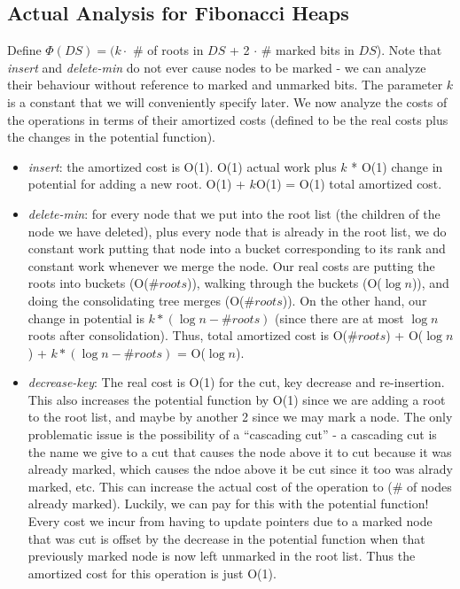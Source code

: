 \documentclass{article}
\begin{document}
\subsection{Actual Analysis for Fibonacci Heaps}

Define $\Phi(DS) = (k \cdot$ \# of roots in $DS$ + 2 $\cdot$ \# marked
bits in $DS$). Note that \emph{insert} and \emph{delete-min} do not ever
cause nodes to be marked - we can analyze their behaviour without
reference to marked and unmarked bits. The parameter $k$
is a constant that we will conveniently specify later. We now analyze
the costs of the operations in terms of their amortized costs (defined
to be the real costs plus the changes in the potential function).

\begin{itemize}
\item \emph{insert}: the amortized cost is O(1). O(1) actual work plus $k$ *
O(1) change in potential for adding a new root. O(1) + $k$O(1) = O(1)
total amortized cost.
\item \emph{delete-min}: for every node that we put into the root list (the
children of the node we have deleted), plus every node that is already
in the root list, we do constant work putting that node into a bucket
corresponding to its rank and
constant work whenever we merge the node. 
Our real costs are putting the roots into buckets (O($\#roots$)), walking
through the buckets (O($\log n$)), and doing the consolidating
tree merges (O($\#roots$)).  On the other hand, our change in potential is
$k*(\log n-\#roots)$ (since there are at most $\log n$ roots after consolidation).
Thus, total amortized cost is O($\#roots$) + O($\log n$) + $k*(\log n-\#roots)$ =
O($\log n$).
\item \emph{decrease-key}: The real cost is O(1) for the cut, key decrease
and re-insertion. This also increases the potential function by O(1)
since we are adding a root to the root list, and maybe by another 2
since we may mark a node. The only problematic issue
is the possibility of a ``cascading cut'' - a cascading cut is the name
we give to a cut that causes the node above it to cut because it was
already marked, which causes the
ndoe above it be cut since it too was alrady marked, etc. This
can increase the actual cost of the operation to (\# of nodes already
marked). Luckily, we can pay for this with the potential function! Every
cost we incur from having to update pointers due to a marked node that
was cut is offset by the decrease in the potential function when that
previously marked node is now left unmarked in the root list. Thus the
amortized cost for this operation is just O(1).

\end{itemize}
\end{document}
